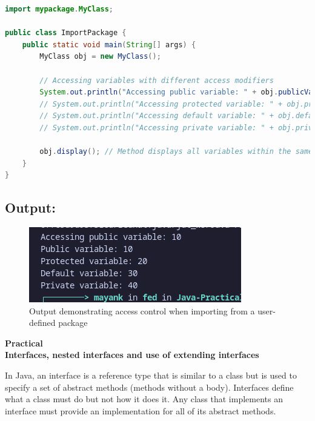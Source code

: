 \documentclass[a4paper,12pt]{article}
\newcounter{practicalno} %
\newcommand{\practicaltitle}[1]{
    \stepcounter{practicalno} %
    \newpage
    \begin{center}
        \vspace{1cm}
        \Large\textbf{Practical \thepracticalno} \\
        \vspace{0.5cm}
        \Large\textbf{#1} %
        \normalsize\vspace{1cm}
    \end{center}
}
\begin{document}
\begin{lstlisting}[language=Java]
import mypackage.MyClass;

public class ImportPackage {
    public static void main(String[] args) {
        MyClass obj = new MyClass();
        
        // Accessing variables with different access modifiers
        System.out.println("Accessing public variable: " + obj.publicVar);
        // System.out.println("Accessing protected variable: " + obj.protectedVar); // Error: Not accessible
        // System.out.println("Accessing default variable: " + obj.defaultVar); // Error: Not accessible
        // System.out.println("Accessing private variable: " + obj.privateVar); // Error: Not accessible

        obj.display(); // Method displays all variables within the same class
    }
}
\end{lstlisting}

\subsection{Output:}
\begin{figure}[H]
    \centering
    \includegraphics[width=0.8\linewidth]{images/29.png}
    \caption{Output demonstrating access control when importing from a user-defined package}
\end{figure}


\setcounter{section}{0}

\practicaltitle{Interfaces, nested interfaces and use of extending interfaces}
In Java, an interface is a reference type that is similar to a class but is used to specify a
set of abstract methods (methods without a body). Interfaces define what a class must
do but not how it does it. Any class that implements an interface must provide an
implementation for all of its abstract methods.
\end{document}
